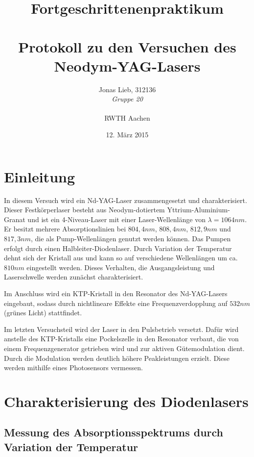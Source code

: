 \documentclass{../Misc/MontavonLaTeX/Montavon}
\date{12. März 2015}
\begin{document}
\title{Fortgeschrittenenpraktikum \\ \quad \\ Protokoll zu den Versuchen des Neodym-YAG-Lasers}
\author{Jonas Lieb, 312136 \\ \emph{Gruppe 20} \\ \\  RWTH Aachen}
\maketitle

\newpage

\tableofcontents
\newpage

\section{Einleitung}
In diesem Versuch wird ein Nd-YAG-Laser zusammengesetzt und charakterisiert. Dieser Festkörperlaser besteht aus Neodym-dotiertem Yttrium-Aluminium-Granat und ist ein 4-Niveau-Laser mit einer Laser-Wellenlänge von $\lambda = 1064 \unit{nm}$. Er besitzt mehrere Absorptionslinien bei $804,4 \unit{nm}$, $808,4 \unit{nm}$, $812,9 \unit{nm}$ und $817,3 \unit{nm}$, die als Pump-Wellenlängen genutzt werden können.
Das Pumpen erfolgt durch einen Halbleiter-Diodenlaser. Durch Variation der Temperatur dehnt sich der Kristall aus und kann so auf verschiedene Wellenlängen um ca. $810 \unit{nm}$ eingestellt werden. Dieses Verhalten, die Ausgangsleistung und Laserschwelle werden zunächst charakterisiert.

Im Anschluss wird ein KTP-Kristall in den Resonator des Nd-YAG-Lasers eingebaut, sodass durch nichtlineare Effekte eine Frequenzverdopplung auf $532 \unit{nm}$ (grünes Licht) stattfindet.

Im letzten Versuchsteil wird der Laser in den Pulsbetrieb versetzt. Dafür wird anstelle des KTP-Kristalls eine Pockelszelle in den Resonator verbaut, die von einem Frequenzgenerator getrieben wird und zur aktiven Gütemodulation dient. Durch die Modulation werden deutlich höhere Peakleistungen erzielt. Diese werden mithilfe eines Photosensors vermessen.

\section{Charakterisierung des Diodenlasers}

\subsection{Messung des Absorptionsspektrums durch Variation der Temperatur}
\end{document}
